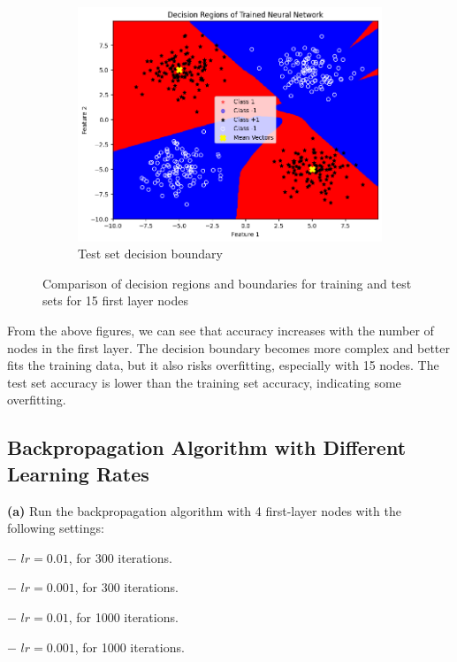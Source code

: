 \documentclass[a4paper,12pt]{article}
\begin{document}
\begin{figure}[H]
    \begin{subfigure}{0.45\textwidth}
        \centering
        \includegraphics[width=\textwidth]{2.2_15_Test.png}
        \caption{Test set decision boundary}
    \end{subfigure}

    \caption{Comparison of decision regions and boundaries for training and test sets for 15 first layer nodes} 
\end{figure}
From the above figures, we can see that accuracy increases with the number of nodes in the first layer. The decision boundary becomes more complex and better fits the training data, but it also risks overfitting, especially with 15 nodes. The test set accuracy is lower than the training set accuracy, indicating some overfitting.
\newpage
\subsection{Backpropagation Algorithm with Different Learning Rates}
\textbf{(a)} Run the backpropagation algorithm with 4 first-layer nodes with the following settings:

\hspace{5mm} $-$ $lr = 0.01$, for 300 iterations.  

\hspace{5mm} $-$ $lr = 0.001$, for 300 iterations.  

\hspace{5mm} $-$ $lr = 0.01$, for 1000 iterations.  

\hspace{5mm} $-$ $lr = 0.001$, for 1000 iterations.  
\end{document}
